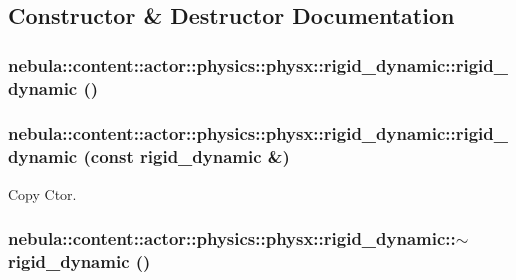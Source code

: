 \subsection{Constructor \& Destructor Documentation}
\hypertarget{classnebula_1_1content_1_1actor_1_1physics_1_1physx_1_1rigid__dynamic_a9151e9410d8e186bbb66a92359171948}{
\subsubsection[{rigid\_\-dynamic}]{\setlength{\rightskip}{0pt plus 5cm}nebula::content::actor::physics::physx::rigid\_\-dynamic::rigid\_\-dynamic ()}}
\label{classnebula_1_1content_1_1actor_1_1physics_1_1physx_1_1rigid__dynamic_a9151e9410d8e186bbb66a92359171948}
\hypertarget{classnebula_1_1content_1_1actor_1_1physics_1_1physx_1_1rigid__dynamic_aab8a53455825d47da2806655dd09e9bb}{
\subsubsection[{rigid\_\-dynamic}]{\setlength{\rightskip}{0pt plus 5cm}nebula::content::actor::physics::physx::rigid\_\-dynamic::rigid\_\-dynamic (const {\bf rigid\_\-dynamic} \&)}}
\label{classnebula_1_1content_1_1actor_1_1physics_1_1physx_1_1rigid__dynamic_aab8a53455825d47da2806655dd09e9bb}


Copy Ctor. \hypertarget{classnebula_1_1content_1_1actor_1_1physics_1_1physx_1_1rigid__dynamic_a8ab4544497b4f2f83eda57d105d2a8cb}{
\subsubsection[{$\sim$rigid\_\-dynamic}]{\setlength{\rightskip}{0pt plus 5cm}nebula::content::actor::physics::physx::rigid\_\-dynamic::$\sim$rigid\_\-dynamic ()}}
\label{classnebula_1_1content_1_1actor_1_1physics_1_1physx_1_1rigid__dynamic_a8ab4544497b4f2f83eda57d105d2a8cb}


